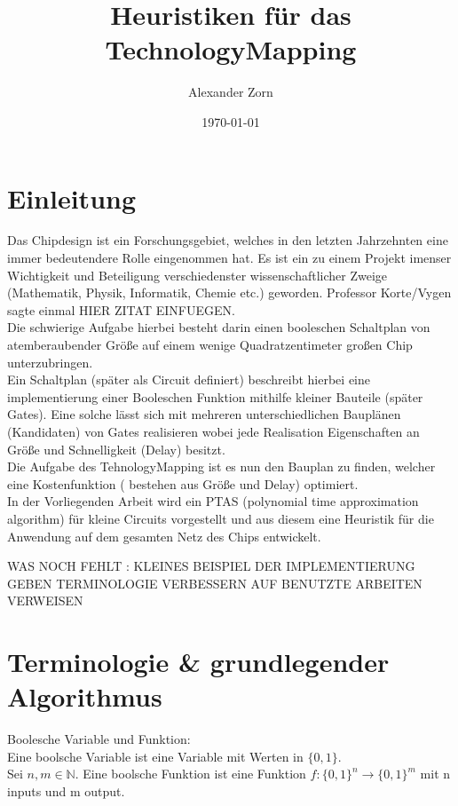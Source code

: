 \documentclass[11pt, a4paper, german]{article}
\author{Alexander Zorn}
\date{\today}
\title{Heuristiken f\"ur das TechnologyMapping}
\newcommand{\TM}{TehnologyMapping }
\begin{document}
\maketitle

\tableofcontents
\newpage

\section{Einleitung}


Das Chipdesign ist ein Forschungsgebiet, welches in den letzten Jahrzehnten eine immer bedeutendere Rolle eingenommen hat. Es ist ein zu einem Projekt imenser Wichtigkeit und Beteiligung verschiedenster wissenschaftlicher Zweige (Mathematik, Physik, Informatik, Chemie etc.) geworden. 
Professor Korte/Vygen sagte einmal HIER ZITAT EINFUEGEN. \\
Die schwierige Aufgabe hierbei besteht darin einen booleschen Schaltplan von atemberaubender Größe auf einem wenige Quadratzentimeter großen Chip unterzubringen.  \\
Ein Schaltplan (später als Circuit definiert) beschreibt hierbei eine implementierung einer Booleschen Funktion mithilfe kleiner Bauteile (später Gates). Eine solche lässt sich mit mehreren unterschiedlichen Bauplänen (Kandidaten) von Gates realisieren wobei jede Realisation Eigenschaften an Größe und Schnelligkeit (Delay) besitzt. \\
Die Aufgabe des \TM  ist es nun den Bauplan zu finden, welcher eine Kostenfunktion ( bestehen aus Größe und Delay) optimiert. \\
In der Vorliegenden Arbeit wird ein PTAS (polynomial time approximation algorithm) für kleine Circuits vorgestellt und aus diesem eine Heuristik für die Anwendung auf dem gesamten Netz des Chips entwickelt.

WAS NOCH FEHLT : KLEINES BEISPIEL DER IMPLEMENTIERUNG GEBEN 
TERMINOLOGIE VERBESSERN 
AUF BENUTZTE ARBEITEN VERWEISEN

\section{Terminologie \& grundlegender Algorithmus}

\begin{definition}{Boolesche Variable und Funktion: } \\
Eine boolsche Variable ist eine Variable mit Werten in $ \{ 0 , 1 \} $. \\
Sei $ n, m \in \mathbb{N}$. Eine boolsche Funktion ist eine Funktion $ f : \{ 0 , 1 \}^n \rightarrow \{ 0 , 1 \}^m $ mit n inputs und m output. 
\end{definition}
\end{document}
